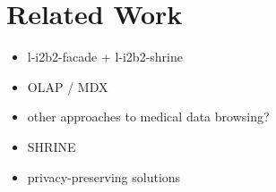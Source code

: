 \section{Related Work}
\begin{itemize}
    \item l-i2b2-facade + l-i2b2-shrine
    \item OLAP / MDX
    \item other approaches to medical data browsing?
    \item SHRINE
    \item privacy-preserving solutions
\end{itemize}


